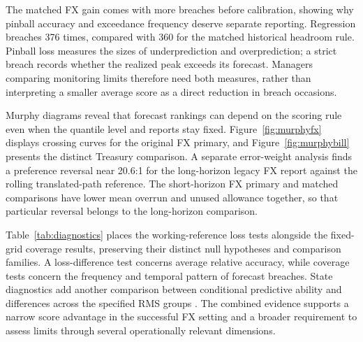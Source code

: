 \documentclass[11pt,a4paper]{article}
\begin{document}
The matched FX gain comes with more breaches before calibration, showing why pinball accuracy and exceedance frequency deserve separate reporting. Regression breaches 376 times, compared with 360 for the matched historical headroom rule. Pinball loss measures the sizes of underprediction and overprediction; a strict breach records whether the realized peak exceeds its forecast. Managers comparing monitoring limits therefore need both measures, rather than interpreting a smaller average score as a direct reduction in breach occasions.


Murphy diagrams reveal that forecast rankings can depend on the scoring rule even when the quantile level and reports stay fixed. Figure~\ref{fig:murphyfx} displays crossing curves for the original FX primary, and Figure~\ref{fig:murphybill} presents the distinct Treasury comparison. A separate error-weight analysis finds a preference reversal near 20.6:1 for the long-horizon legacy FX report against the rolling translated-path reference. The short-horizon FX primary and matched comparisons have lower mean overrun and unused allowance together, so that particular reversal belongs to the long-horizon comparison.


Table~\ref{tab:diagnostics} places the working-reference loss tests alongside the fixed-grid coverage results, preserving their distinct null hypotheses and comparison families. A loss-difference test concerns average relative accuracy, while coverage tests concern the frequency and temporal pattern of forecast breaches. State diagnostics add another comparison between conditional predictive ability and differences across the specified RMS groups \citep{gw2006}. The combined evidence supports a narrow score advantage in the successful FX setting and a broader requirement to assess limits through several operationally relevant dimensions.
\end{document}
